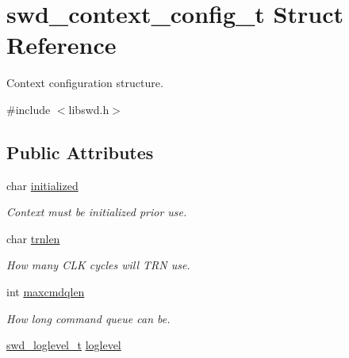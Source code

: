 \hypertarget{structswd__context__config__t}{
\section{swd\_\-context\_\-config\_\-t Struct Reference}
\label{structswd__context__config__t}
}


Context configuration structure.  




{\ttfamily \#include $<$libswd.h$>$}

\subsection*{Public Attributes}
\begin{DoxyCompactItemize}
\item 
\hypertarget{structswd__context__config__t_aace7f48f97b84859691957f86f81afba}{
char \hyperlink{structswd__context__config__t_aace7f48f97b84859691957f86f81afba}{initialized}}
\label{structswd__context__config__t_aace7f48f97b84859691957f86f81afba}

\begin{DoxyCompactList}\small\item\em Context must be initialized prior use. \item\end{DoxyCompactList}\item 
\hypertarget{structswd__context__config__t_ada3e484ab916767e16dcfcae5300c0f8}{
char \hyperlink{structswd__context__config__t_ada3e484ab916767e16dcfcae5300c0f8}{trnlen}}
\label{structswd__context__config__t_ada3e484ab916767e16dcfcae5300c0f8}

\begin{DoxyCompactList}\small\item\em How many CLK cycles will TRN use. \item\end{DoxyCompactList}\item 
\hypertarget{structswd__context__config__t_abbee7e8722672bd5f38d6f151f608f14}{
int \hyperlink{structswd__context__config__t_abbee7e8722672bd5f38d6f151f608f14}{maxcmdqlen}}
\label{structswd__context__config__t_abbee7e8722672bd5f38d6f151f608f14}

\begin{DoxyCompactList}\small\item\em How long command queue can be. \item\end{DoxyCompactList}\item 
\hypertarget{structswd__context__config__t_a2f3509f25cc8bc80b263a0569afafe1d}{
\hyperlink{libswd_8h_ab68cbcef79d602fc0fe70cb65c43e898}{swd\_\-loglevel\_\-t} \hyperlink{structswd__context__config__t_a2f3509f25cc8bc80b263a0569afafe1d}{loglevel}}
\label{structswd__context__config__t_a2f3509f25cc8bc80b263a0569afafe1d}


\end{DoxyCompactItemize}
